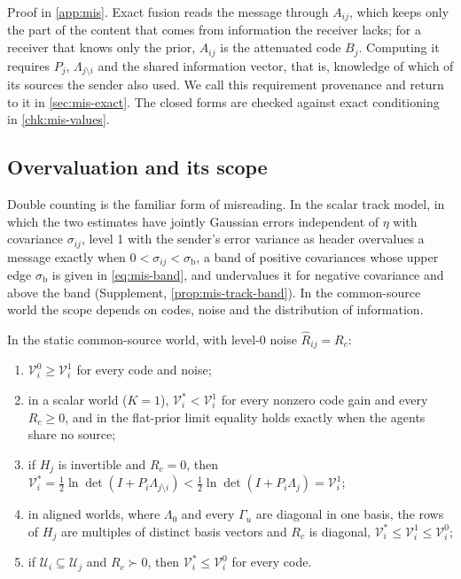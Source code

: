 Proof in \cref{app:mis}. Exact fusion reads the message through $A_{ij}$, which keeps only the part of the content that comes from information the receiver lacks; for a receiver that knows only the prior, $A_{ij}$ is the attenuated code $B_j$. Computing it requires $P_j$, $\Lambda_{j\setminus i}$ and the shared information vector, that is, knowledge of which of its sources the sender also used. We call this requirement provenance and return to it in \cref{sec:mis-exact}. The closed forms are checked against exact conditioning in \cref{chk:mis-values}.

\subsection{Overvaluation and its scope}\label{sec:mis-over}

Double counting is the familiar form of misreading. In the scalar track model, in which the two estimates have jointly Gaussian errors independent of $\eta$ with covariance $\sigma_{ij}$, level 1 with the sender's error variance as header overvalues a message exactly when $0<\sigma_{ij}<\sigma_{\mathrm b}$, a band of positive covariances whose upper edge $\sigma_{\mathrm b}$ is given in \eqref{eq:mis-band}, and undervalues it for negative covariance and above the band (Supplement, \cref{prop:mis-track-band}). In the common-source world the scope depends on codes, noise and the distribution of information.

\begin{proposition}\label{prop:mis-overvaluation-scope}
In the static common-source world, with level-0 noise $\hat R_{ij}=R_c$:
\begin{enumerate}
\item[(a)] $\mathcal V^0_i\ge\mathcal V^1_i$ for every code and noise;
\item[(b)] in a scalar world ($K=1$), $\mathcal V^\ast_i<\mathcal V^1_i$ for every nonzero code gain and every $R_c\ge0$, and in the flat-prior limit equality holds exactly when the agents share no source;
\item[(c)] if $H_j$ is invertible and $R_c=0$, then $\mathcal V^\ast_i=\tfrac12\ln\det(I+P_i\Lambda_{j\setminus i})<\tfrac12\ln\det(I+P_i\Lambda_j)=\mathcal V^1_i$;
\item[(d)] in aligned worlds, where $\Lambda_0$ and every $\Gamma_u$ are diagonal in one basis, the rows of $H_j$ are multiples of distinct basis vectors and $R_c$ is diagonal, $\mathcal V^\ast_i\le\mathcal V^1_i\le\mathcal V^0_i$;
\item[(e)] if $\mathcal U_i\subseteq\mathcal U_j$ and $R_c\succ0$, then $\mathcal V^\ast_i\le\mathcal V^0_i$ for every code.
\end{enumerate}
\end{proposition}

